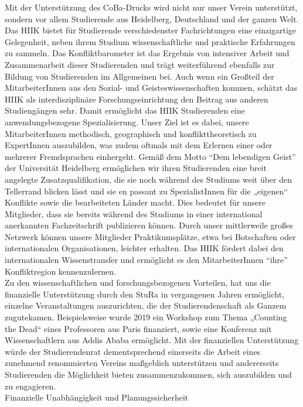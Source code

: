 {    Mit der Unterstützung des CoBa-Drucks wird nicht nur unser Verein unterstützt, sondern vor allem Studierende aus Heidelberg, Deutschland und der ganzen Welt. Das HIIK bietet für Studierende verschiedenster Fachrichtungen eine einzigartige Gelegenheit, neben ihrem Studium wissenschaftliche und praktische Erfahrungen zu sammeln. Das Konfliktbarometer ist das Ergebnis von intensiver Arbeit und Zusammenarbeit dieser Studierenden und trägt weiterführend ebenfalls zur Bildung von Studierenden im Allgemeinen bei. Auch wenn ein Großteil der MitarbeiterInnen aus den Sozial- und Geisteswissenschaften kommen, schätzt das HIIK als interdisziplinäre Forschungseinrichtung den Beitrag aus anderen Studiengängen sehr. Damit ermöglicht das HIIK Studierenden eine anwendungsbezogene Spezialisierung. Unser Ziel ist es dabei, unsere MitarbeiterInnen methodisch, geographisch und konflikttheoretisch zu ExpertInnen auszubilden, was zudem oftmals mit dem Erlernen einer oder mehrerer Fremdsprachen einhergeht. Gemäß dem Motto “Dem lebendigen Geist” der Universität Heidelberg ermöglichen wir ihren Studierenden eine breit angelegte Zusatzqualifikation, die sie noch während des Studiums weit über den Tellerrand blicken lässt und sie en passant zu SpezialistInnen für die „eigenen“ Konflikte sowie die bearbeiteten Länder macht. Dies bedeutet für unsere Mitglieder, dass sie bereits während des Studiums in einer international anerkannten Fachzeitschrift publizieren können. Durch unser mittlerweile großes Netzwerk können unsere Mitglieder Praktikumsplätze, etwa bei Botschaften oder internationalen Organisationen, leichter erhalten. Das HIIK fördert dabei den internationalen Wissenstransfer und ermöglicht es den MitarbeiterInnen “ihre” Konfliktregion kennenzulernen.\\
    Zu den wissenschaftlichen und forschungsbezogenen Vorteilen, hat uns die finanzielle Unterstützung durch den StuRa in vergangenen Jahren ermöglicht, einzelne Veranstaltungen auszurichten, die der Studierendenschaft als Ganzem zugutekamen. Beispielsweise wurde 2019 ein Workshop zum Thema „Counting the Dead“ eines Professoren aus Paris finanziert, sowie eine Konferenz mit Wissenschaftlern aus Addis Ababa ermöglicht. Mit der finanziellen Unterstützung würde der Studierendenrat dementsprechend einerseits die Arbeit eines zunehmend renommierten Vereins maßgeblich unterstützen und andererseits Studierenden die Möglichkeit bieten zusammenzukommen, sich auszubilden und zu engagieren.\\
    Finanzielle Unabhängigkeit und Planungssicherheit\\
}
